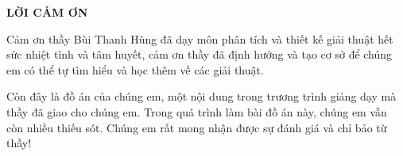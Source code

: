 \newpage
\changefontsizes{16pt}
\centerline{\textbf{LỜI CẢM ƠN}}

\changefontsizes{13pt}
\bigskip
\setlength{\parindent}{2cm}


Cảm ơn thầy Bùi Thanh Hùng đã dạy môn phân tích và thiết kế giải thuật hết sức nhiệt tình và tâm huyết, cảm ơn thầy đã định hướng và tạo cơ sở để chúng em có thể tự tìm hiểu và học thêm về các giải thuật.

Còn đây là đồ án của chúng em, một nội dung trong trương trình giảng dạy mà thầy đã giao cho chúng em. Trong quá trình làm bài đồ án này, chúng em vẫn còn nhiều thiếu sót. Chúng em rất mong nhận được sự đánh giá và chỉ bảo từ thầy!
    